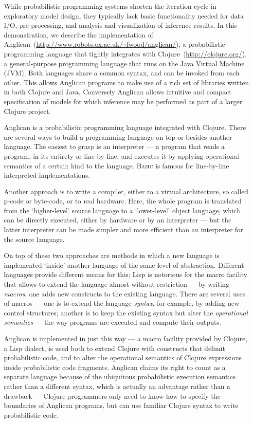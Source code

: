 \documentclass[preprint]{sigplanconf}
\begin{document}
While probabilistic programming systems shorten the iteration cycle in
exploratory model design, they typically lack basic functionality needed for
data I/O, pre-processing, and analysis and visualization of inference results.
In this demonstration, we describe the implementation of
Anglican~(\url{http://www.robots.ox.ac.uk/~fwood/anglican/}), a probabilistic
programming language that tightly integrates with
Clojure~(\url{http://clojure.org/}), a general-purpose programming language
that runs on the Java Virtual Machine (JVM). Both languages share a common
syntax, and can be invoked from each other. This allows Anglican programs to
make use of a rich set of libraries written in both Clojure and Java.
Conversely Anglican allows intuitive and compact specification of models for
which inference may be performed as part of a larger Clojure project.

Anglican is a probabilistic programming language integrated with
Clojure.  There are several ways to build a programming language
on top or besides another language.  The easiest to grasp is an
interpreter --- a program that reads a program, in its entirety
or line-by-line, and executes it by applying operational
semantics of a certain kind to the language. \textsc{Basic} is
famous for line-by-line interpreted implementations.

Another approach is to write a compiler, either to a virtual
architecture, so called p-code or byte-code, or to real
hardware. Here, the whole program is translated from the
`higher-level' source language to a `lower-level' object
language, which can be directly executed, either by hardware or
by an interpreter --- but the latter interpreter can be made
simpler and more efficient  than an interpreter for the source
language.

On top of these two approaches are methods in which a new
language is implemented `inside' another language of the same
level of abstraction. Different languages provide different
means for this; Lisp is notorious for the macro facility
that allows to extend the language almost without
restriction --- by writing \textit{macros}, one adds new
constructs to the existing language. There are several uses of
macros --- one is to extend the language \textit{syntax}, for
example, by adding new control structures; another is to keep
the existing syntax but alter the \textit{operational semantics}
--- the way programs are executed and compute their outputs.

Anglican is implemented in just this way --- a macro facility
provided by Clojure, a Lisp dialect, is used both to extend
Clojure with constructs that delimit probabilistic code, and to
alter the operational semantics of Clojure expressions inside
probabilistic code fragments. Anglican claims its right to count
as a separate language because of the ubiquitous probabilistic
execution semantics rather than a different syntax,
which is actually an advantage rather than a drawback ---
Clojure programmers only need to know how to specify the
boundaries of Anglican programs, but can use familiar Clojure
syntax to write probabilistic code. 
\end{document}
